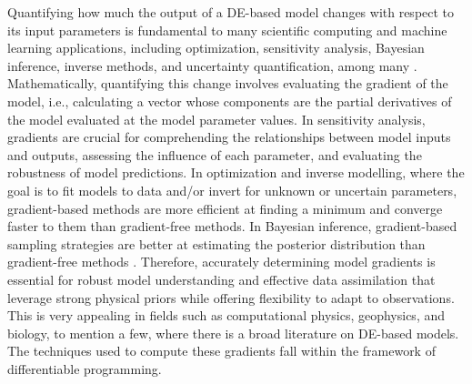 Quantifying how much the output of a DE-based model changes with respect to its input parameters is fundamental to many scientific computing and machine learning applications, including optimization, sensitivity analysis, Bayesian inference, inverse methods, and uncertainty quantification, among many \cite{Razavi.2021}. 
Mathematically, quantifying this change involves evaluating the gradient of the model, i.e., calculating a vector whose components are the partial derivatives of the model evaluated at the model parameter values. 
In sensitivity analysis, gradients are crucial for comprehending the relationships between model inputs and outputs, assessing the influence of each parameter, and evaluating the robustness of model predictions. 
In optimization and inverse modelling, where the goal is to fit models to data and/or invert for unknown or uncertain parameters, gradient-based methods are more efficient at finding a minimum and converge faster to them than gradient-free methods.
In Bayesian inference, gradient-based sampling strategies are better at estimating the posterior distribution than gradient-free methods \cite{neal2011mcmc}.
Therefore, accurately determining model gradients is essential for robust model understanding and effective data assimilation that leverage strong physical priors while offering flexibility to adapt to observations. 
This is very appealing in fields such as computational physics, geophysics, and biology, to mention a few, where there is a broad literature on DE-based models.
The techniques used to compute these gradients fall within the framework of differentiable programming.

